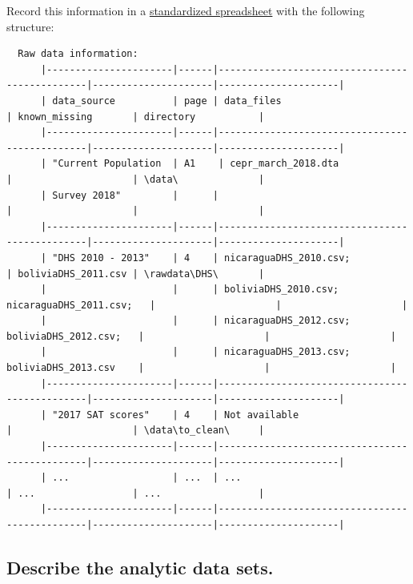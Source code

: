 \documentclass[]{book}
\begin{document}
Record this information in a \href{https://docs.google.com/spreadsheets/d/1LUIdVFH0OfR70C7z07TYeE-uWzKI_JIeWUMaYhqEKK0/edit\#gid=0\&range=A1}{standardized spreadsheet} with the following structure:

\begin{verbatim}
  Raw data information:
      |----------------------|------|-----------------------------------------------|---------------------|---------------------|
      | data_source          | page | data_files                                    | known_missing       | directory           |
      |----------------------|------|-----------------------------------------------|---------------------|---------------------|
      | "Current Population  | A1    | cepr_march_2018.dta                          |                     | \data\              |
      | Survey 2018"         |      |                                               |                     |                     |
      |----------------------|------|-----------------------------------------------|---------------------|---------------------|
      | "DHS 2010 - 2013"    | 4    | nicaraguaDHS_2010.csv;                        | boliviaDHS_2011.csv | \rawdata\DHS\       |
      |                      |      | boliviaDHS_2010.csv; nicaraguaDHS_2011.csv;   |                     |                     |
      |                      |      | nicaraguaDHS_2012.csv; boliviaDHS_2012.csv;   |                     |                     |
      |                      |      | nicaraguaDHS_2013.csv; boliviaDHS_2013.csv    |                     |                     |
      |----------------------|------|-----------------------------------------------|---------------------|---------------------|
      | "2017 SAT scores"    | 4    | Not available                                 |                     | \data\to_clean\     |
      |----------------------|------|-----------------------------------------------|---------------------|---------------------|
      | ...                  | ...  | ...                                           | ...                 | ...                 |
      |----------------------|------|-----------------------------------------------|---------------------|---------------------|
\end{verbatim}

\hypertarget{describe-the-analytic-data-sets.}{%
\subsection{Describe the analytic data sets.}\label{describe-the-analytic-data-sets.}}
\end{document}
